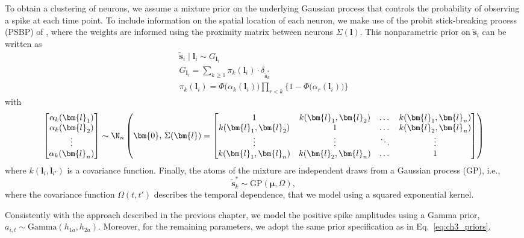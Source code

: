To obtain a clustering of neurons, we assume a mixture prior on the underlying Gaussian process that controls the probability of observing a spike at each time point. 
To include information on the spatial location of each neuron, we make use of the probit stick-breaking process (PSBP) of \textcite{rodriguez2011}, where the weights are informed using the proximity matrix between neurons $\Sigma(\bm{l})$.
This nonparametric prior on $\tilde{\bm{s}}_i$ can be written as
\begin{equation}
\begin{gathered}
\tilde{\bm{s}}_i\mid \bm{l}_i  \sim G_{\bm{l}_i}\\
G_{\bm{l}_i} = \sum_{k\geq1} \pi_k(\bm{l}_i)\cdot \delta_{\tilde{\bm{s}}^*_k }\\
\pi_k(\bm{l}_i) = \Phi\big(\alpha_k(\bm{l}_i)\big) \prod_{r<k} \big\{ 1- \Phi\big(\alpha_r(\bm{l}_i)\big)\big\}
\end{gathered}
\end{equation}
with 
\begin{equation*}
\begin{bmatrix}
\alpha_k(\bm{l}_1) \\
\alpha_k(\bm{l}_2) \\
\vdots \\
\alpha_k(\bm{l}_n) 
\end{bmatrix} \sim \N_n \left(
\bm{0},\, \Sigma(\bm{l}) = 
\begin{bmatrix}
1 & k(\bm{l}_1,\bm{l}_2) & \dots & k(\bm{l}_1,\bm{l}_n)\\
k(\bm{l}_1,\bm{l}_2) & 1 & \dots & k(\bm{l}_2,\bm{l}_n) \\
\vdots & \vdots & \ddots & \vdots \\
k(\bm{l}_1,\bm{l}_n) & k(\bm{l}_2,\bm{l}_n) & \dots & 1
\end{bmatrix}
\right)
\end{equation*}
where $k(\bm{l}_i,\bm{l}_{i'})$ is a covariance function. Finally, the atoms of the mixture are independent draws from a Gaussian process (GP), i.e.,
\begin{equation*}
\tilde{\bm{s}}^*_k \sim \mathrm{GP}(\bm{\mu},\Omega),
\end{equation*}
where the covariance function $\Omega(t,t')$ describes the temporal dependence, that we model using a squared exponential kernel.

Consistently with the approach described in the previous chapter, we model the positive spike amplitudes using a Gamma prior, $a_{i,t}\sim\mathrm{Gamma}(h_{1a},h_{2a})$. Moreover, for the remaining parameters, we adopt the same prior specification as in Eq.~\eqref{eq:ch3_priors}.


